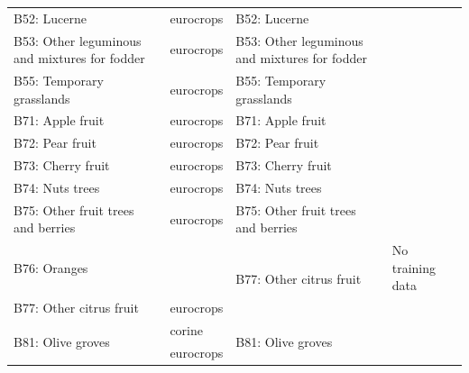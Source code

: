 \begin{table}[]
\begin{tabular}{l{2cm}lll}
B52: Lucerne                                  & eurocrops               & B52: Lucerne                                          &                                                           \\
B53: Other leguminous and mixtures for fodder & eurocrops               & B53: Other leguminous and mixtures for fodder         &                                                           \\
B55: Temporary grasslands                     & eurocrops               & B55: Temporary grasslands                             &                                                           \\
B71: Apple fruit                              & eurocrops               & B71: Apple fruit                                      &                                                           \\
B72: Pear fruit                               & eurocrops               & B72: Pear fruit                                       &                                                           \\
B73: Cherry fruit                             & eurocrops               & B73: Cherry fruit                                     &                                                           \\
B74: Nuts trees                               & eurocrops               & B74: Nuts trees                                       &                                                           \\
B75: Other fruit trees and berries            & eurocrops               & B75: Other fruit trees and berries                    &                                                           \\
B76: Oranges                                  &                         & \multirow{2}{*}{B77: Other citrus fruit}              & No training data                                          \\
B77: Other citrus fruit                       & eurocrops               &                                                       &                                                           \\
\multirow{2}{*}{B81: Olive groves}            & corine                  & \multirow{2}{*}{B81: Olive groves}                    &                                                           \\
                                              & eurocrops               &                                                       &                                                           \\

\end{tabular}
\end{table}
